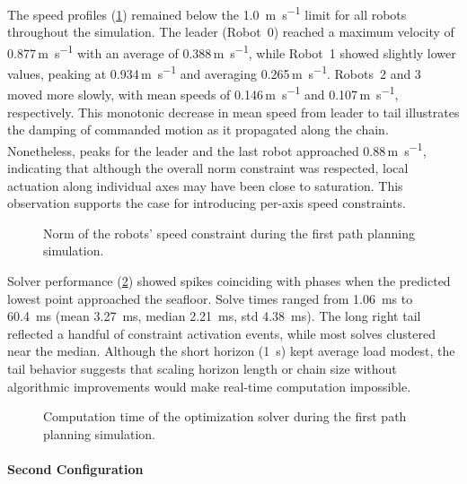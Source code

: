The speed profiles (\cref{rcc_s_pp_r_fc_robots_speed}) remained below the \qty{1.0}{\m\per\s} limit
for all robots throughout the simulation. The leader (Robot~0) reached a maximum velocity of
\num{0.877}\,\si{\m\per\s} with an average of \num{0.388}\,\si{\m\per\s}, while Robot~1 showed
slightly lower values, peaking at \num{0.934}\,\si{\m\per\s} and averaging
\num{0.265}\,\si{\m\per\s}. Robots~2 and 3 moved more slowly, with mean speeds of
\num{0.146}\,\si{\m\per\s} and \num{0.107}\,\si{\m\per\s}, respectively. This monotonic decrease in
mean speed from leader to tail illustrates the damping of commanded motion as it propagated along
the chain. Nonetheless, peaks for the leader and the last robot approached
\num{0.88}\,\si{\m\per\s}, indicating that although the overall norm constraint was respected,
local actuation along individual axes may have been close to saturation. This observation supports
the case for introducing per-axis speed constraints.

\begin{figure}
	\centering
	\caption{Norm of the robots' speed constraint during the first path planning simulation.}
	\label{rcc_s_pp_r_fc_robots_speed}
\end{figure}

Solver performance (\cref{rcc_s_pp_r_fc_compute_time}) showed spikes coinciding with phases when
the predicted lowest point approached the seafloor. Solve times ranged from
\qty{1.06}{\milli\second} to \qty{60.4}{\milli\second} (mean \qty{3.27}{\milli\second}, median
\qty{2.21}{\milli\second}, std \qty{4.38}{\milli\second}). The long right tail reflected a handful
of constraint activation events, while most solves clustered near the median. Although the short
horizon (\qty{1}{\second}) kept average load modest, the tail behavior suggests that scaling
horizon length or chain size without algorithmic improvements would make real-time computation
impossible.

\begin{figure}
	\centering
	\caption{Computation time of the optimization solver during the first path planning simulation.}
	\label{rcc_s_pp_r_fc_compute_time}
\end{figure}

\paragraph{Second Configuration}
\label{rcc_s_pp_r_second_configuration}

